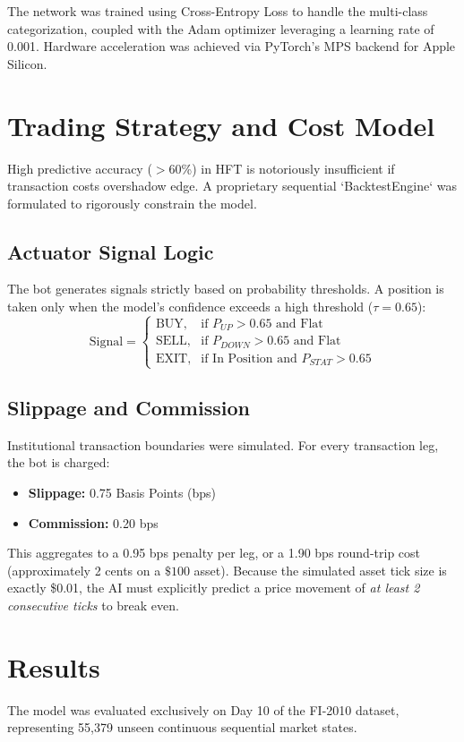 \documentclass[journal]{IEEEtran}
\begin{document}
The network was trained using Cross-Entropy Loss to handle the multi-class categorization, coupled with the Adam optimizer leveraging a learning rate of 0.001. Hardware acceleration was achieved via PyTorch's MPS backend for Apple Silicon.

\section{Trading Strategy and Cost Model}
High predictive accuracy ($>$60\%) in HFT is notoriously insufficient if transaction costs overshadow edge. A proprietary sequential `BacktestEngine` was formulated to rigorously constrain the model.

\subsection{Actuator Signal Logic}
The bot generates signals strictly based on probability thresholds. A position is taken only when the model's confidence exceeds a high threshold ($\tau = 0.65$):
\begin{equation}
\text{Signal} = 
\begin{cases} 
\text{BUY}, & \text{if } P_{UP} > 0.65 \text{ and Flat} \\
\text{SELL}, & \text{if } P_{DOWN} > 0.65 \text{ and Flat} \\
\text{EXIT}, & \text{if } \text{In Position and } P_{STAT} > 0.65
\end{cases}
\end{equation}

\subsection{Slippage and Commission}
Institutional transaction boundaries were simulated. For every transaction leg, the bot is charged:
\begin{itemize}
    \item \textbf{Slippage:} 0.75 Basis Points (bps)
    \item \textbf{Commission:} 0.20 bps
\end{itemize}
This aggregates to a 0.95 bps penalty per leg, or a 1.90 bps round-trip cost (approximately 2 cents on a $\$100$ asset). Because the simulated asset tick size is exactly \$0.01, the AI must explicitly predict a price movement of \textit{at least 2 consecutive ticks} to break even.

\section{Results}
The model was evaluated exclusively on Day 10 of the FI-2010 dataset, representing 55,379 unseen continuous sequential market states. 
\end{document}
